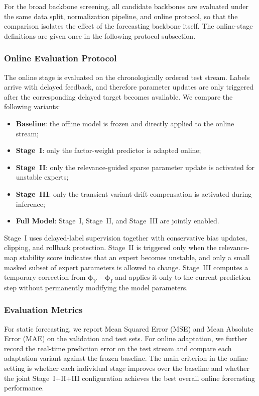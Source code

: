 ﻿\documentclass[journal]{IEEEtran}
\begin{document}
For the broad backbone screening, all candidate backbones are evaluated under the same data split, normalization pipeline, and online protocol, so that the comparison isolates the effect of the forecasting backbone itself. The online-stage definitions are given once in the following protocol subsection.

\subsubsection{Online Evaluation Protocol}
The online stage is evaluated on the chronologically ordered test stream. Labels arrive with delayed feedback, and therefore parameter updates are only triggered after the corresponding delayed target becomes available. We compare the following variants:
\begin{itemize}
\item \textbf{Baseline}: the offline model is frozen and directly applied to the online stream;
\item \textbf{Stage~I}: only the factor-weight predictor is adapted online;
\item \textbf{Stage~II}: only the relevance-guided sparse parameter update is activated for unstable experts;
\item \textbf{Stage~III}: only the transient variant-drift compensation is activated during inference;
\item \textbf{Full Model}: Stage~I, Stage~II, and Stage~III are jointly enabled.
\end{itemize}

Stage~I uses delayed-label supervision together with conservative bias updates, clipping, and rollback protection. Stage~II is triggered only when the relevance-map stability score indicates that an expert becomes unstable, and only a small masked subset of expert parameters is allowed to change. Stage~III computes a temporary correction from $\boldsymbol{\phi}_V-\boldsymbol{\phi}_I$ and applies it only to the current prediction step without permanently modifying the model parameters.

\subsubsection{Evaluation Metrics}
For static forecasting, we report Mean Squared Error (MSE) and Mean Absolute Error (MAE) on the validation and test sets. For online adaptation, we further record the real-time prediction error on the test stream and compare each adaptation variant against the frozen baseline. The main criterion in the online setting is whether each individual stage improves over the baseline and whether the joint Stage~I+II+III configuration achieves the best overall online forecasting performance.
\end{document}
